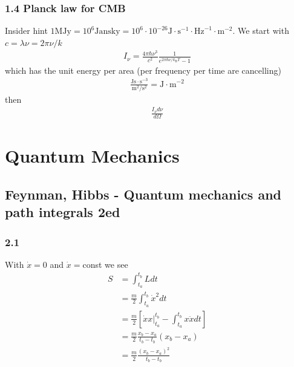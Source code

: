 \documentclass[10pt,a4paper]{article}
\theoremstyle{definition}
\begin{document}
\subsubsection{1.4 Planck law for CMB}
Insider hint $1\text{MJy} =10^6\text{Jansky}=10^6\cdot10^{-26}\text{J}\cdot\text{s}^{-1}\cdot\text{Hz}^{-1}\cdot\text{m}^{-2}$. We start with $c=\lambda\nu=2\pi\nu/k$
\begin{align}
I_\nu=\frac{4\pi\hbar\nu^3}{c^2}\frac{1}{e^{2\pi\hbar\nu/k_\text{B}T}-1}
\end{align}
which has the unit energy per area (per frequency per time are cancelling)
\begin{align}
\frac{\text{Js}\cdot \text{s}^{-3}}{\text{m}^2/\text{s}^2}=\text{J}\cdot\text{m}^{-2}
\end{align}
then
\begin{align}
\frac{I_\nu d\nu}{d\Omega}
\end{align}

\section{Quantum Mechanics}
\subsection{{\sc Feynman, Hibbs} - Quantum mechanics and path integrals 2ed}
\subsubsection{2.1}
With $\dot x=0$ and $\dot x=$const we see
\begin{align}
    S&=\int_{t_a}^{t_b}L dt\\
    &=\frac{m}{2}\int_{t_a}^{t_b}\dot x^2 dt\\
    &=\frac{m}{2}\left[\left.\dot x x\right|_{t_a}^{t_b}-\int_{t_a}^{t_b} x\ddot xdt\right]\\
    &=\frac{m}{2}\frac{x_b-x_a}{t_b-t_b}(x_b-x_a)\\
     &=\frac{m}{2}\frac{(x_b-x_a)^2}{t_b-t_b}
\end{align}
\end{document}
